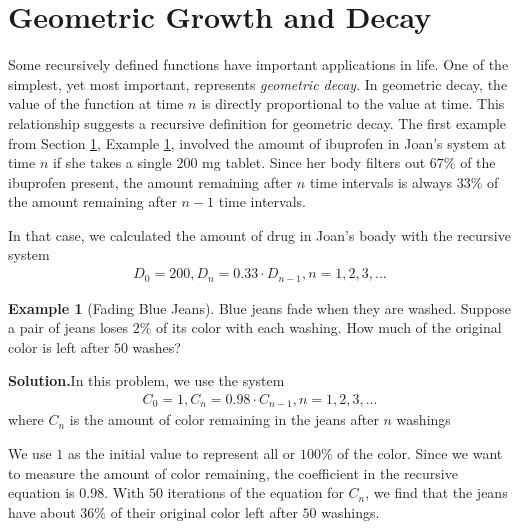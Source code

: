 \documentclass[10pt,]{book}
\theoremstyle{plain}
\theoremstyle{definition}
\theoremstyle{definition}
\newtheorem{example}[theorem]{Example}
\theoremstyle{definition}
\numberwithin{equation}{section}
\begin{document}
\section[{Geometric Growth and Decay}]{Geometric Growth and Decay}\label{chapter04-section03}
Some recursively defined functions have important applications in life.  One of the simplest, yet most important, represents \emph{geometric decay}. In geometric decay, the value of the function at time \(n\) is directly proportional to the value at time. This relationship suggests a recursive definition for geometric decay. The first example from Section \hyperref[chapter04-section01]{1}, Example \hyperref[ibuprofen-example-one-dose]{1}, involved the amount of ibuprofen in Joan's system at time \(n\) if she takes a single \(200\) mg tablet. Since her body filters out \(67\%\) of the ibuprofen present, the amount remaining after \(n\) time intervals is always \(33\%\) of the amount remaining after \(n-1\) time intervals.%
\par
In that case, we calculated the amount of drug in Joan's boady with the recursive system%
%
\begin{gather*}
D_0=200, D_n=0.33 \cdot D_{n-1}, n=1,2,3,...
\end{gather*}
\begin{example}[Fading Blue Jeans]\label{example-fading-blue-jeans}
Blue jeans fade when they are washed. Suppose a pair of jeans loses \(2\%\) of its color with each washing.  How much of the original color is left after \(50\) washes?%
\par\medskip\noindent%
\textbf{Solution.}\quad In this problem, we use the system%
%
\begin{gather*}
C_0=1, C_n=0.98 \cdot C_{n-1}, n=1,2,3,...
\end{gather*}
where \(C_n\) is the amount of color remaining in the jeans after \(n\) washings%
\par
We use \(1\) as the initial value to represent all or \(100\%\) of the color.  Since we want to measure the amount of color remaining, the coefficient in the recursive equation is \(0.98\).  With \(50\) iterations of the equation for \(C_n\), we find that the jeans have about \(36\%\) of their original color left after \(50\) washings.%
\end{example}
\end{document}
